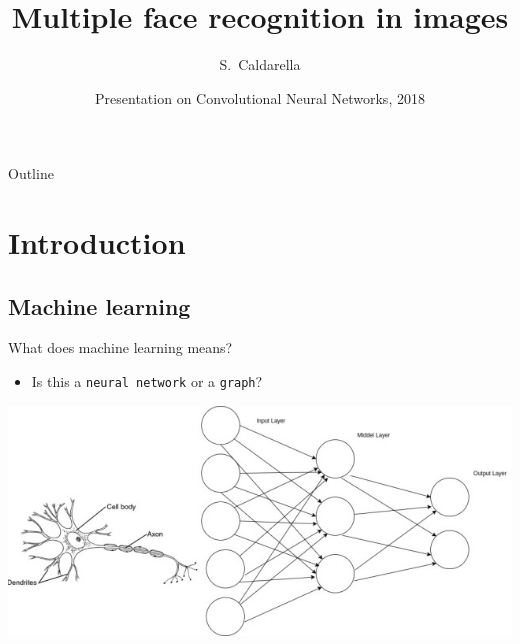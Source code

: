 \documentclass{beamer}
\title[Face recognition] %
{Multiple face recognition in images}
\author[Simone Caldarella] %
{S.~Caldarella }
\institute[University of Brescia] %
{
  IEEE Student Branch Brescia\\
  University of Brescia}
\date[IEEE Student Branch 2018] %
{Presentation on Convolutional Neural Networks, 2018}
\begin{document}
\begin{frame}
  \titlepage
\end{frame}

\begin{frame}{Outline}
\begin{multicols}{2}
  \tableofcontents
  \end{multicols}
\end{frame}





\section{Introduction}

\subsection{Machine learning}

\begin{frame}{What does machine learning means?}

  \begin{itemize}
[triangle]
  \item
    Is this a \texttt{neural network} or a \texttt{graph}?
 \end{itemize}
\includegraphics[scale=0.5]{neuralNet}
\end{frame}
\end{document}
